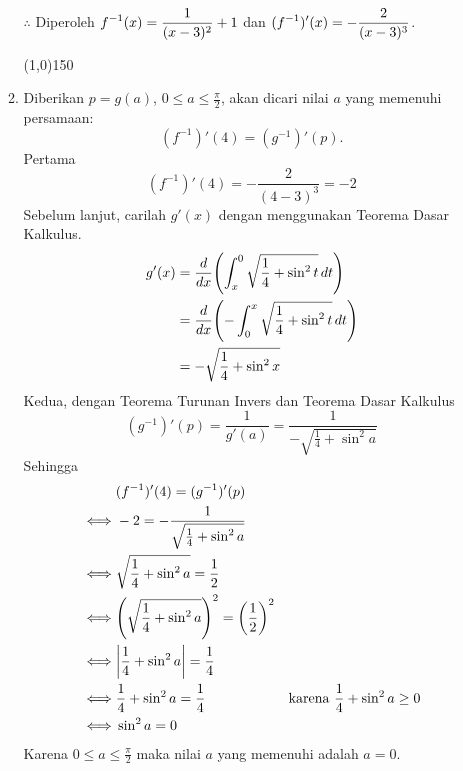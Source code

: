 \begin{enumerate}[leftmargin=*, label={\arabic*}.]
\begin{enumerate}[label={\alph*}.]
    $\therefore$ Diperoleh $\displaystyle f^{-1}(x) = \frac{1}{(x-3)^{2}}+1$ dan 
    $\displaystyle (f^{-1})'(x) =-\frac{2}{(x-3)^{3}}$.
\begin{center}
    \line(1,0){150}
\end{center}
    \item Diberikan $p=g(a)$, $0\leq a \leq \frac{\pi}{2}$, akan dicari nilai $a$ 
    yang memenuhi persamaan:
    \[
    (f^{-1})'(4)=(g^{-1})'(p).
    \]
    Pertama
    \[
        (f^{-1})'(4)=-\frac{2}{(4-3)^{3}} = -2
    \]
    Sebelum lanjut, carilah $g'(x)$ dengan menggunakan Teorema Dasar Kalkulus.
    \begin{align*}
        g'(x) &= \drv{x}{\int_{x}^{0}\sqrt{\frac{1}{4}+\sin^{2}t}\,dt}\\
        &= \drv{x}{-\int_{0}^{x}\sqrt{\frac{1}{4}+\sin^{2}t}\,dt}\\
        &= -\sqrt{\frac{1}{4}+\sin^{2}x}\\
    \end{align*}
    Kedua, dengan Teorema Turunan Invers dan Teorema Dasar Kalkulus
    \[
        (g^{-1})'(p) =\frac{1}{g'(a)} =\frac{1}{-\sqrt{\frac{1}{4}+\sin^{2}a}}
    \]
    Sehingga 
    \begin{align*}
        &(f^{-1})'(4)=(g^{-1})'(p)\\
        \iff & -2 = -\frac{1}{\sqrt{\frac{1}{4}+\sin^{2}a}}\\
        \iff & \sqrt{\frac{1}{4}+\sin^{2}a} = \frac{1}{2}\\
        \iff & \brk*{\sqrt{\frac{1}{4}+\sin^{2}a}}^2 = \brk*{\frac{1}{2}}^{2}\\
        \iff & \abs*{\frac{1}{4}+\sin^{2}a} = \frac{1}{4}\\
        \iff & \frac{1}{4}+\sin^{2}a = \frac{1}{4}
        &\text{karena } \frac{1}{4}+\sin^{2}a \geq 0\\
        \iff & \sin^{2}a = 0
    \end{align*}
    Karena $0\leq a \leq \frac{\pi}{2}$ maka nilai $a$ yang memenuhi adalah $a=0$.


\end{enumerate}
\end{enumerate}
